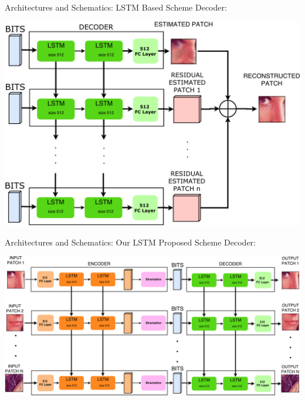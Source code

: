 \documentclass[10pt]{beamer}
\begin{document}
\begin{frame}{Architectures and Schematics: LSTM Based Scheme}
  Decoder:
  \begin{center}
    \includegraphics[width=\linewidth]{./img/LSTM_global_decoder.pdf}
  \end{center}
\end{frame}

\begin{frame}{Architectures and Schematics: Our LSTM Proposed Scheme}
  Decoder:
  \begin{center}
    \includegraphics[width=\linewidth]{./img/Our_LSTM.pdf}
  \end{center}
\end{frame}





  \begingroup
\end{document}
